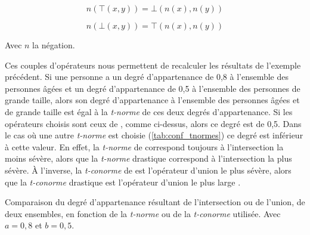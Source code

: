 \begin{equation}
  n(⊤(x,y)) = ⊥(n(x), n(y))
\end{equation}

\begin{equation}
  n(⊥(x,y)) = ⊤(n(x), n(y))
\end{equation}

Avec \(n\) la négation.

Ces couples d'opérateurs nous permettent de recalculer les résultats
de l'exemple précédent. Si une personne a un degré d'appartenance de
0,8 à l'ensemble des personnes âgées et un degré d'appartenance de 0,5
à l'ensemble des personnes de grande taille, alors son degré
d'appartenance à l'ensemble des personnes âgées et de grande taille
est égal à la \emph{t-norme} de ces deux degrés d'appartenance. Si les
opérateurs choisis sont ceux de \textcite{Zadeh1965}, comme ci-dessus,
alors ce degré est de 0,5. Dans le cas où une autre \emph{t-norme} est
choisie (\autoref{tab:conf_tnormes}) ce degré est inférieur à cette
valeur. En effet, la \emph{t-norme} de \textcite{Zadeh1965} correspond
toujours à l'intersection la moins sévère, alors que la \emph{t-norme}
drastique correspond à l'intersection la plus sévère. À l'inverse, la
\emph{t-conorme} de \textcite{Zadeh1965} est l'opérateur d'union le
plus sévère, alors que la \emph{t-conorme} drastique est l'opérateur
d'union le plus large \autocite{Bouchon-Meunier2007}.

\begin{table}
  \centering
  
  \caption{Comparaison du degré d'appartenance résultant de
    l'intersection ou de l'union, de deux ensembles, en fonction de la
    \emph{t-norme} ou de la \emph{t-conorme} utilisée. Avec
    \(a = 0,8\) et \(b = 0,5\).}
  \label{tab:conf_tnormes}
\end{table}

